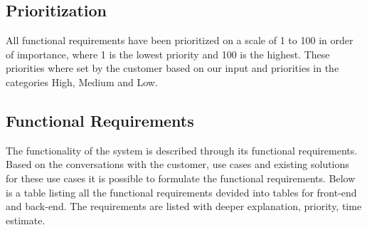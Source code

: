 \documentclass[11pt,a4paper,titlepage,oneside]{report}
\begin{document}
  \subsection{Prioritization}
  All functional requirements have been prioritized on a scale of 1 to 100 in order of importance, where 1 is the lowest priority and 100 is the highest. These priorities where set by the customer based on our input and priorities in the categories High, Medium and Low.

  \subsection{Functional Requirements}
  The functionality of the system is described through its functional requirements. Based on the conversations with the customer, use cases and existing solutions for these use cases it is possible to formulate the functional requirements. Below is a table listing all the functional requirements devided into tables for front-end and back-end. The requirements are listed with deeper explanation, priority, time estimate.
  \\
\end{document}
